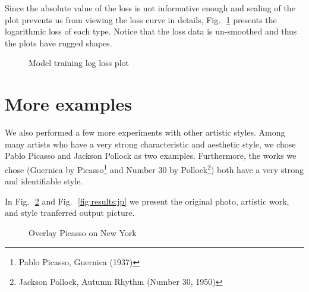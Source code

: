 Since the absolute value of the loss is not informative enough and
scaling of the plot prevents us from viewing the loss curve in details,
Fig.\,~\ref{fig:results:vg:logloss} presents the logarithmic loss of each type.
Notice that the loss data is un-smoothed and thus the plots have rugged shapes.

    \begin{figure}[!hbt]
    \center
    \caption{Model training log loss plot}
    \label{fig:results:vg:logloss}
    \end{figure}



\section{More examples}

We also performed a few more experiments with other artistic styles.
Among many artists who have a very strong characteristic and aesthetic style,
we chose Pablo Picasso and Jackson Pollock as two examples.
Furthermore, the works we chose
(Guernica by Picasso\footnote{Pablo Picasso, Guernica (1937)} and
Number 30 by Pollock\footnote{Jackson Pollock, Autumn Rhythm (Number 30, 1950)})
both have a very strong and identifiable style.

In Fig.\,~\ref{fig:results:pp} and Fig.\,~\ref{fig:results:jp} we present
the original photo, artistic work, and style tranferred output picture.

    \begin{figure}[!hbt]
    \center
    \caption{Overlay Picasso on New York}
    \label{fig:results:pp}
    \end{figure}

